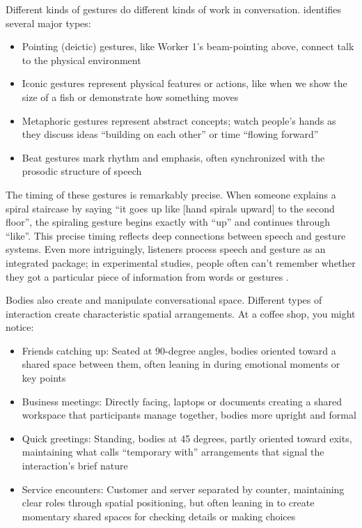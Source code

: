 Different kinds of gestures do different kinds of work in conversation. \citet{mcneill1992} identifies several major types:
\begin{itemize}[noitemsep]
  \item Pointing (deictic) gestures, like Worker 1's beam-pointing above, connect talk to the physical environment 
  \item Iconic gestures represent physical features or actions, like when we show the size of a fish or demonstrate how something moves 
  \item Metaphoric gestures represent abstract concepts; watch people's hands as they discuss ideas \enquote{building on each other} or time \enquote{flowing forward} 
  \item Beat gestures mark rhythm and emphasis, often synchronized with the prosodic structure of speech 
\end{itemize}
The timing of these gestures is remarkably precise. When someone explains a spiral staircase by saying \enquote{it goes up like [hand spirals upward] to the second floor}, the spiraling gesture begins exactly with \enquote{up} and continues through \enquote{like}. This precise timing reflects deep connections between speech and gesture systems. Even more intriguingly, listeners process speech and gesture as an integrated package; in experimental studies, people often can't remember whether they got a particular piece of information from words or gestures \citep{gurney2013}.

Bodies also create and manipulate conversational space. Different types of interaction create characteristic spatial arrangements. At a coffee shop, you might notice:
\begin{itemize}[noitemsep]
  \item Friends catching up: Seated at 90-degree angles, bodies oriented toward a shared space between them, often leaning in during emotional moments or key points
  \item Business meetings: Directly facing, laptops or documents creating a shared workspace that participants manage together, bodies more upright and formal
  \item Quick greetings: Standing, bodies at 45 degrees, partly oriented toward exits, maintaining what \citet{kendon1990} calls \enquote{temporary with} arrangements that signal the interaction's brief nature
  \item Service encounters: Customer and server separated by counter, maintaining clear roles through spatial positioning, but often leaning in to create momentary shared spaces for checking details or making choices
\end{itemize}

